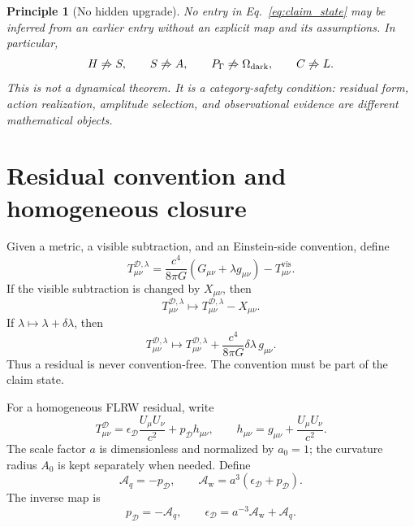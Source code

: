 \documentclass[
  aps,
  prd,
  reprint,
  superscriptaddress,
  floatfix,
  nofootinbib,
  longbibliography
]{revtex4-2}
\theoremstyle{plain}
\newtheorem{principle}[theorem]{Principle}
\theoremstyle{definition}
\theoremstyle{remark}
\newcommand{\D}{\mathcal D}
\newcommand{\vis}{\mathrm{vis}}
\newcommand{\Aq}{\mathcal A_q}
\newcommand{\Aw}{\mathcal A_{\mathrm w}}
\begin{document}
\begin{principle}[No hidden upgrade]
No entry in Eq.~\eqref{eq:claim_state} may be inferred from an earlier entry without an explicit map and its assumptions.  In particular,
\begin{equation}
H\not\Rightarrow S,
\qquad
S\not\Rightarrow A,
\qquad
P_\Gamma\not\Rightarrow \Omega_{\rm dark},
\qquad
C\not\Rightarrow L.
\label{eq:no_upgrade}
\end{equation}
This is not a dynamical theorem.  It is a category-safety condition: residual form, action realization, amplitude selection, and observational evidence are different mathematical objects.
\end{principle}

\section{Residual convention and homogeneous closure}

Given a metric, a visible subtraction, and an Einstein-side convention, define
\begin{equation}
\boxed{
T^{\D,\lambda}_{\mu\nu}=
\frac{c^4}{8\pi G}(G_{\mu\nu}+\lambda g_{\mu\nu})-T^{\vis}_{\mu\nu}.}
\label{eq:residual}
\end{equation}
If the visible subtraction is changed by $X_{\mu\nu}$, then
\begin{equation}
T^{\D,\lambda}_{\mu\nu}\mapsto T^{\D,\lambda}_{\mu\nu}-X_{\mu\nu}.
\label{eq:visible_shift}
\end{equation}
If $\lambda\mapsto\lambda+\delta\lambda$, then
\begin{equation}
T^{\D,\lambda}_{\mu\nu}\mapsto
T^{\D,\lambda}_{\mu\nu}+\frac{c^4}{8\pi G}\delta\lambda\,g_{\mu\nu}.
\label{eq:lambda_shift}
\end{equation}
Thus a residual is never convention-free.  The convention must be part of the claim state.

For a homogeneous FLRW residual, write
\begin{equation}
T^{\D}_{\mu\nu}=
\epsilon_\D\frac{U_\mu U_\nu}{c^2}+p_\D h_{\mu\nu},
\qquad
h_{\mu\nu}=g_{\mu\nu}+\frac{U_\mu U_\nu}{c^2}.
\end{equation}
The scale factor $a$ is dimensionless and normalized by $a_0=1$; the curvature radius $A_0$ is kept separately when needed.  Define
\begin{equation}
\boxed{
\Aq=-p_\D,
\qquad
\Aw=a^3(\epsilon_\D+p_\D).}
\label{eq:atlas}
\end{equation}
The inverse map is
\begin{equation}
p_\D=-\Aq,
\qquad
\epsilon_\D=a^{-3}\Aw+
\Aq.
\label{eq:atlas_inv}
\end{equation}
\end{document}
